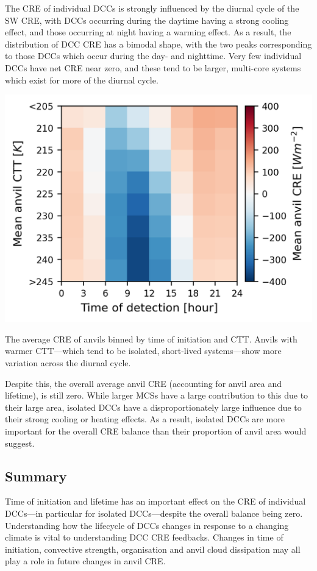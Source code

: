 \documentclass{tufte-handout}
\begin{document}
The CRE of individual DCCs is strongly influenced by the diurnal cycle of the SW CRE, with DCCs occurring during the daytime having a strong cooling effect, and those occurring at night having a warming effect.
As a result, the distribution of DCC CRE has a bimodal shape, with the two peaks corresponding to those DCCs which occur during the day- and nighttime.
Very few individual DCCs have net CRE near zero, and these tend to be larger, multi-core systems which exist for more of the diurnal cycle.

\begin{marginfigure}[1\baselineskip]%
  \includegraphics[width=\linewidth]{figures/handout_fig5.png}
  \caption{The average CRE of anvils binned by time of initiation and CTT. Anvils with warmer CTT---which tend to be isolated, short-lived systems---show more variation across the diurnal cycle.}
  \label{fig:marginfig}
\end{marginfigure}

Despite this, the overall average anvil CRE (accounting for anvil area and lifetime), is still zero.
While larger MCSs have a large contribution to this due to their large area, isolated DCCs have a disproportionately large influence due to their strong cooling or heating effects.
As a result, isolated DCCs are more important for the overall CRE balance than their proportion of anvil area would suggest.

\subsection{Summary}

Time of initiation and lifetime has an important effect on the CRE of individual DCCs---in particular for isolated DCCs---despite the overall balance being zero.
Understanding how the lifecycle of DCCs changes in response to a changing climate is vital to understanding DCC CRE feedbacks.
Changes in time of initiation, convective strength, organisation and anvil cloud dissipation may all play a role in future changes in anvil CRE.



\end{document}
